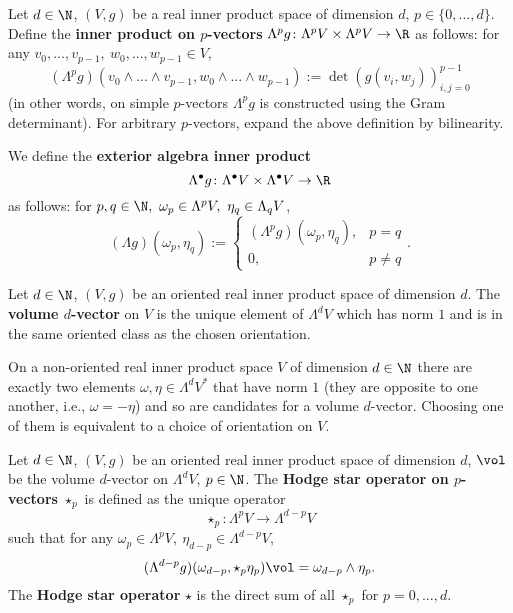 \begin{definition}
  Let
    $d \in \N$,
    $(V, g)$ be a real inner product space of dimension $d$,
    $p \in \{0, ..., d\}$.
  Define the \textbf{inner product on $p$-vectors}
  $\Lambda^p g \colon \Lambda^p V \times \Lambda^p V \to \R$ as follows:
  for any $v_0, ..., v_{p - 1},\ w_0, ..., w_{p - 1} \in V$,
  \begin{equation}
    (\Lambda^p g)
    (v_0 \wedge ... \wedge v_{p - 1}, w_0 \wedge ... \wedge w_{p - 1})
    := \det (g(v_i, w_j))_{i, j = 0}^{p - 1}
  \end{equation}
  (in other words, on simple $p$-vectors $\Lambda^p g$ is constructed using
  the Gram determinant).
  For arbitrary $p$-vectors, expand the above definition by bilinearity.

  We define the \textbf{exterior algebra inner product}
  \begin{equation}
    \Lambda^\bullet g \colon \Lambda^\bullet V \times \Lambda^\bullet V \to \R
  \end{equation}
  as follows:
  for $p, q \in \N,\ \omega_p \in \Lambda^p V,\ \eta_q \in \Lambda_q V$,
  \begin{equation}
    (\Lambda g)(\omega_p, \eta_q) :=
    \begin{cases}
      (\Lambda^p g)(\omega_p, \eta_q), & p = q \\
      0, & p \neq q
    \end{cases}.
  \end{equation}
\end{definition}
\begin{definition}
  Let
    $d \in \N$,
    $(V, g)$ be an oriented real inner product space of dimension $d$.
  The \textbf{volume $d$-vector} on $V$ is the unique element of $\Lambda^d V$
  which has norm $1$ and is in the same oriented class as the chosen
  orientation.
\end{definition}
\begin{remark}
  On a non-oriented real inner product space $V$ of dimension $d \in \N$
  there are exactly two elements $\omega, \eta \in\Lambda^d V^*$ that have norm
  $1$ (they are opposite to one another, i.e., $\omega = -\eta$) and so are
  candidates for a volume $d$-vector.
  Choosing one of them is equivalent to a choice of orientation on $V$.
\end{remark}
\begin{definition}
  Let
    $d \in \N$,
    $(V, g)$ be an oriented real inner product space of dimension $d$,
    $\vol$ be the volume $d$-vector on $\Lambda^d V$,
    $p \in \N$.
  The \textbf{Hodge star operator on $p$-vectors} $\star_p$
  is defined as the unique operator
  \begin{equation}
    \star_p \colon \Lambda^p V \to \Lambda^{d - p} V
  \end{equation}
  such that for any
  $\omega_p \in \Lambda^p V,\ \eta_{d - p} \in \Lambda^{d - p} V$,
  \begin{equation}
    (\Lambda^{d - p} g)(\omega_{d - p}, \star_p \eta_p) \vol
    = \omega_{d - p} \wedge \eta_p.
  \end{equation}
  The \textbf{Hodge star operator} $\star$ is the direct sum of all $\star_p$
  for $p = 0, ..., d$.
\end{definition}
